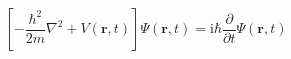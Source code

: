 \documentclass{article}
\begin{document}
\[
    \left[ -\frac{\hbar^2}{2m} \nabla^2 + V(\mathbf{r}, t) \right]
    \Psi(\mathbf{r}, t)
  = \mathrm{i} \hbar \frac{\partial}{\partial t} \Psi(\mathbf{r}, t)
\]
\end{document}
